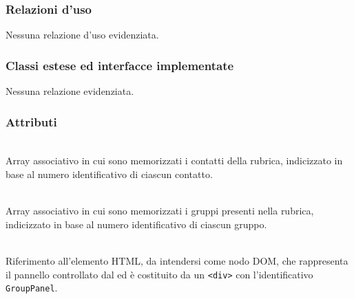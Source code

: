 \subsubsection*{Relazioni d'uso}
Nessuna relazione d'uso evidenziata.

\subsubsection*{Classi estese ed interfacce implementate}
Nessuna relazione evidenziata.

\subsubsection*{Attributi}
\begin{description}

  \item{}\\
  Array associativo in cui sono memorizzati i contatti della rubrica, indicizzato in base al numero identificativo di ciascun contatto.
  
  \item{}\\
  Array associativo in cui sono memorizzati i gruppi presenti nella rubrica, indicizzato in base al numero identificativo di ciascun gruppo.
  
  \item{}\\
  Riferimento all'elemento HTML, da intendersi come nodo DOM, che rappresenta il pannello controllato dal  ed è costituito da un \verb'<div>' con l'identificativo \verb'GroupPanel'.
  
\end{description}


